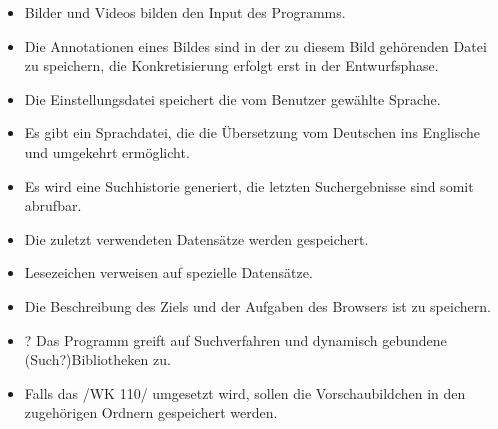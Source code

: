\begin{itemize}
	\item Bilder und Videos bilden den Input des Programms.
	\item Die Annotationen eines Bildes sind in der zu diesem Bild gehörenden Datei zu speichern, die Konkretisierung erfolgt erst 		in der Entwurfsphase.
	\item Die Einstellungsdatei speichert die vom Benutzer gewählte Sprache.
	\item Es gibt ein Sprachdatei, die die Übersetzung vom Deutschen ins Englische und umgekehrt ermöglicht.
	\item Es wird eine Suchhistorie generiert, die letzten Suchergebnisse sind somit abrufbar. 
	\item Die zuletzt verwendeten Datensätze werden gespeichert.
	\item Lesezeichen verweisen auf spezielle Datensätze.
	\item Die Beschreibung des Ziels und der Aufgaben des Browsers ist zu speichern.
	\item ? Das Programm greift auf Suchverfahren und dynamisch gebundene (Such?)Bibliotheken zu.
	\item Falls das /WK 110/ umgesetzt wird, sollen die Vorschaubildchen in den zugehörigen Ordnern gespeichert werden.
\end{itemize}
